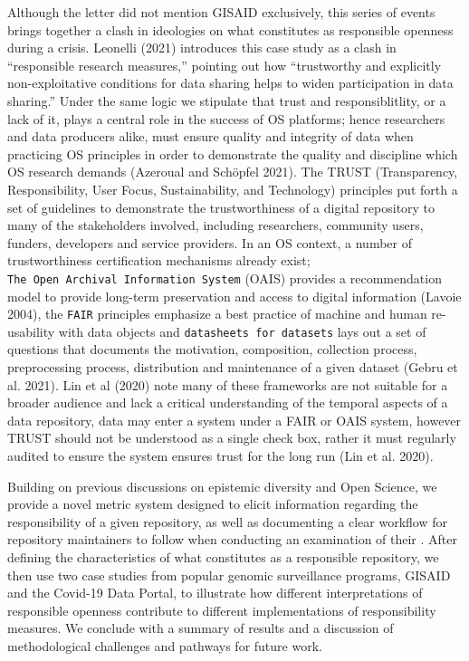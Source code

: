\documentclass{article}
\begin{document}
Although the letter did not mention GISAID exclusively, this series of
events brings together a clash in ideologies on what constitutes as
responsible openness during a crisis. Leonelli (2021) introduces this
case study as a clash in ``responsible research measures,'' pointing out
how ``trustworthy and explicitly non-exploitative conditions for data
sharing helps to widen participation in data sharing.'' Under the same
logic we stipulate that trust and responsiblitlity, or a lack of it,
plays a central role in the success of OS platforms; hence researchers
and data producers alike, must ensure quality and integrity of data when
practicing OS principles in order to demonstrate the quality and
discipline which OS research demands (Azeroual and Schöpfel 2021). The
TRUST (Transparency, Responsibility, User Focus, Sustainability, and
Technology) principles put forth a set of guidelines to demonstrate the
trustworthiness of a digital repository to many of the stakeholders
involved, including researchers, community users, funders, developers
and service providers. In an OS context, a number of trustworthiness
certification mechanisms already exist;
\texttt{The\ Open\ Archival\ Information\ System} (OAIS) provides a
recommendation model to provide long-term preservation and access to
digital information (Lavoie 2004), the \texttt{FAIR} principles
emphasize a best practice of machine and human re-usability with data
objects and \texttt{datasheets\ for\ datasets} lays out a set of
questions that documents the motivation, composition, collection
process, preprocessing process, distribution and maintenance of a given
dataset (Gebru et al. 2021). Lin et al (2020) note many of these
frameworks are not suitable for a broader audience and lack a critical
understanding of the temporal aspects of a data repository, data may
enter a system under a FAIR or OAIS system, however TRUST should not be
understood as a single check box, rather it must regularly audited to
ensure the system ensures trust for the long run (Lin et al. 2020).

Building on previous discussions on epistemic diversity and Open
Science, we provide a novel metric system designed to elicit information
regarding the responsibility of a given repository, as well as
documenting a clear workflow for repository maintainers to follow when
conducting an examination of their . After defining the characteristics
of what constitutes as a responsible repository, we then use two case
studies from popular genomic surveillance programs, GISAID and the
Covid-19 Data Portal, to illustrate how different interpretations of
responsible openness contribute to different implementations of
responsibility measures. We conclude with a summary of results and a
discussion of methodological challenges and pathways for future work.
\end{document}

